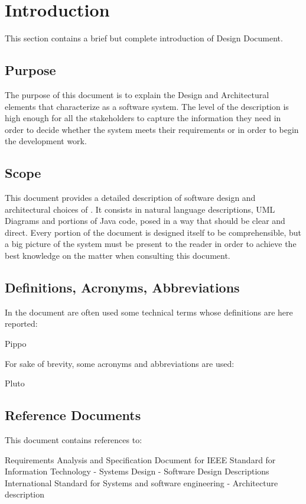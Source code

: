 \section{Introduction}
This section contains a brief but complete introduction of \myTaxiService{} Design Document.

\subsection{Purpose}
The purpose of this document is to explain the Design and Architectural elements that characterize \myTaxiService{} as a software system. The level of the description is high enough for all the stakeholders to capture the information they need in order to decide whether the system meets their requirements or in order to begin the development work.

\subsection{Scope}
This document provides a detailed description of \myTaxiService{} software design and architectural choices of \myTaxiService{}.
It consists in natural language descriptions, UML Diagrams and portions of Java code, posed in a way that should be clear and direct.
Every portion of the document is designed itself to be comprehensible, but a big picture of the system must be present to the reader in order to achieve the best knowledge on the matter when consulting this document.

\subsection{Definitions, Acronyms, Abbreviations}
In the document are often used some technical terms whose definitions are here reported:
\begin{itemize}
	 Pippo
\end{itemize}
For sake of brevity, some acronyms and abbreviations are used:
\begin{itemize}
	 Pluto
\end{itemize}

\subsection{Reference Documents}
This document contains references to:
\begin{itemize}
	  Requirements Analysis and Specification Document for \myTaxiService{}
	 IEEE Standard for Information Technology - Systems Design - Software Design Descriptions
	 International Standard for Systems and software engineering - Architecture description
\end{itemize}

